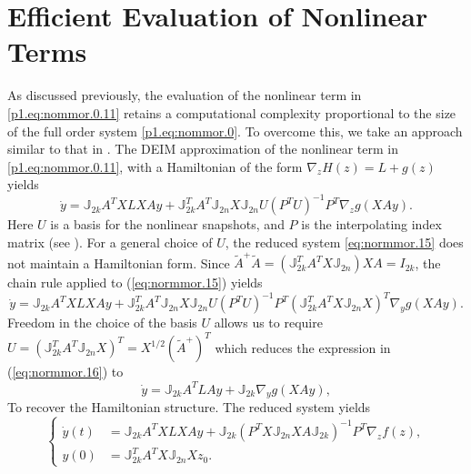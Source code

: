 \section{Efficient Evaluation of Nonlinear Terms} \label{sec:normmor.3}
As discussed previously, the evaluation of the nonlinear term in \eqref{p1.eq:nommor.0.11} retains a computational complexity proportional to the size of the full order system \eqref{p1.eq:nommor.0}. To overcome this, we take an approach similar to that in . The DEIM approximation of the nonlinear term in \eqref{p1.eq:nommor.0.11}, with a Hamiltonian of the form $\nabla_z H(z) = L + g(z)$ yields
\begin{equation} \label{eq:normmor.15}
	\dot y = \mathbb J_{2k} A^TXLXAy + \mathbb J_{2k}^T A^T \mathbb J_{2n} X \mathbb J_{2n} U (P^TU)^{-1} P^T \nabla_z g(XAy).
\end{equation}
Here $U$ is a basis for the nonlinear snapshots, and $P$ is the interpolating index matrix (see ). For a general choice of $U$, the reduced system \eqref{eq:normmor.15} does not maintain a Hamiltonian form. Since $ \tilde A^+ \tilde A = ( \mathbb J_{2k}^T A^T X \mathbb J_{2n}) X A = I_{2k}$, the chain rule applied to (\ref{eq:normmor.15}) yields
\begin{equation} \label{eq:normmor.16}
	\dot y = \mathbb J_{2k} A^TXLXAy + \mathbb J_{2k}^T A^T \mathbb J_{2n} X \mathbb J_{2n} U (P^TU)^{-1} P^T (\mathbb J_{2k}^T A^T X \mathbb J_{2n} X)^T \nabla_y g(XAy).
\end{equation}
Freedom in the choice of the basis $U$ allows us to require $U = (\mathbb J_{2k}^T A^T \mathbb J_{2n} X)^T = X^{1/2} (\tilde A^+)^T$ which reduces the expression in (\ref{eq:normmor.16}) to
\begin{equation} \label{eq:normmor.17}
	\dot y = \mathbb J_{2k} A^TLAy + \mathbb J_{2k} \nabla_y g(XAy),
\end{equation}
To recover the Hamiltonian structure. The reduced system yields
\begin{equation} \label{eq:normmor.18}
\left\{
\begin{aligned}
	\dot y(t) &= \mathbb J_{2k} A^TXLXAy + \mathbb J_{2k} ( P^TX \mathbb J_{2n} X A \mathbb J_{2k})^{-1} P^T \nabla_z f(z), \\
	y(0) &= \mathbb J_{2k}^T A^T X \mathbb J_{2n} X z_0.
\end{aligned}
\right.
\end{equation}
